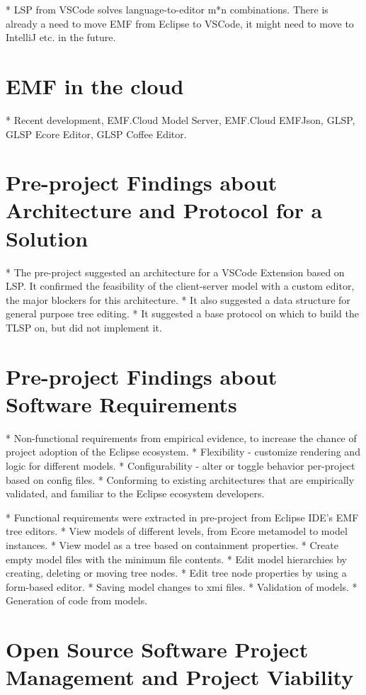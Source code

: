 * LSP from VSCode solves language-to-editor m*n combinations. There is already a need to move EMF from Eclipse to VSCode, it might need to move to IntelliJ etc. in the future.

\section{\acrlong{EMF} in the \Gls{cloud}}

* Recent development, EMF.Cloud Model Server, EMF.Cloud EMFJson, GLSP, GLSP Ecore Editor, GLSP Coffee Editor.

\section{Pre-project Findings about Architecture and Protocol for a Solution}

* The pre-project suggested an architecture for a VSCode Extension based on LSP. It confirmed the feasibility of the client-server model with a custom editor, the major blockers for this architecture.
  * It also suggested a data structure for general purpose tree editing.
  * It suggested a base protocol on which to build the TLSP on, but did not implement it.

\section{Pre-project Findings about Software Requirements}

* Non-functional requirements from empirical evidence, to increase the chance of project adoption of the Eclipse ecosystem.
    * Flexibility - customize rendering and logic for different models.
    * Configurability - alter or toggle behavior per-project based on config files.
    * Conforming to existing architectures that are empirically validated, and familiar to the Eclipse ecosystem developers.

* Functional requirements were extracted in pre-project from Eclipse IDE's EMF tree editors.
  * View models of different levels, from Ecore metamodel to model instances.
  * View model as a tree based on containment properties.
  * Create empty model files with the minimum file contents.
  * Edit model hierarchies by creating, deleting or moving tree nodes.
  * Edit tree node properties by using a form-based editor.
  * Saving model changes to xmi files.
  * Validation of models.
  * Generation of code from models.


\section{Open Source Software Project Management and Project Viability}


